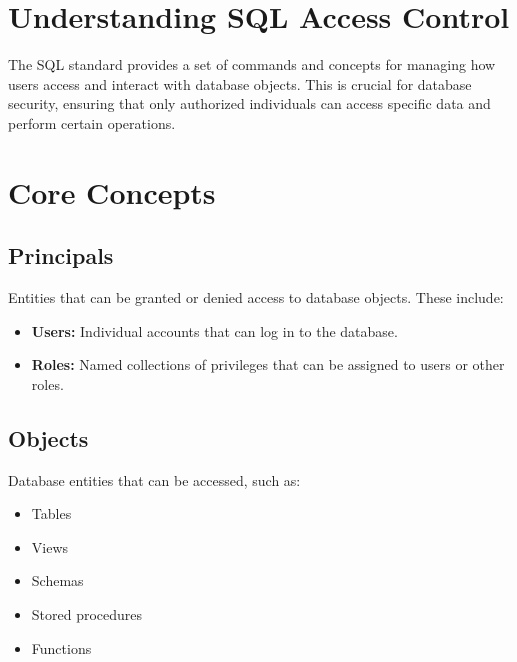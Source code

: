 \documentclass[12pt,a4paper]{article}
\begin{document}
\section*{Understanding SQL Access Control}

The SQL standard provides a set of commands and concepts for managing how users access and interact with database objects. This is crucial for database security, ensuring that only authorized individuals can access specific data and perform certain operations.

\section{Core Concepts}

\subsection{Principals}
Entities that can be granted or denied access to database objects. These include:
\begin{itemize}
    \item \textbf{Users:} Individual accounts that can log in to the database.
    \item \textbf{Roles:} Named collections of privileges that can be assigned to users or other roles.
\end{itemize}

\subsection{Objects}
Database entities that can be accessed, such as:
\begin{itemize}
    \item Tables
    \item Views
    \item Schemas
    \item Stored procedures
    \item Functions
\end{itemize}
\end{document}
